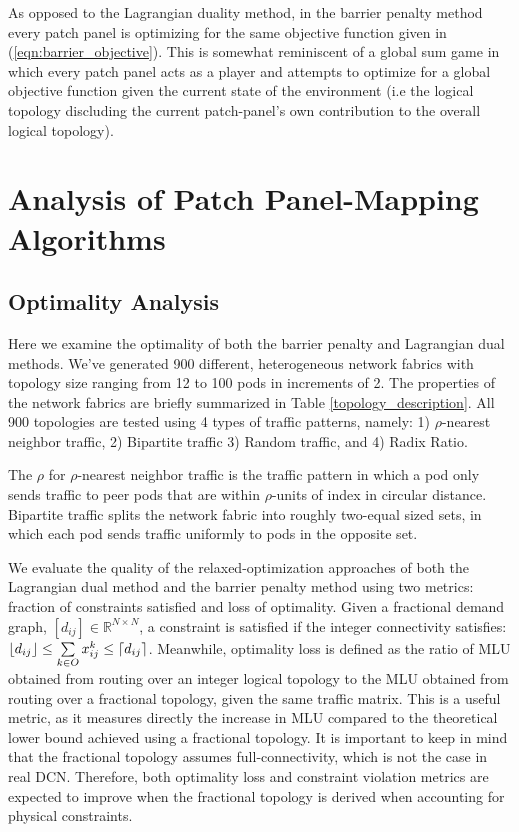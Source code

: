 \documentclass[sigconf]{acmart}
\theoremstyle{definition}
\begin{document}
As opposed to the Lagrangian duality method, in the barrier penalty method every patch panel is optimizing for the same objective function given in (\ref{eqn:barrier_objective}). This is somewhat reminiscent of a global sum game in which every patch panel acts as a player and attempts to optimize for a global objective function given the current state of the environment (i.e the logical topology discluding the current patch-panel's own contribution to the overall logical topology).

\section{Analysis of Patch Panel-Mapping Algorithms}\label{section_reconfiguration_algo_analysis}
\subsection{Optimality Analysis}
Here we examine the optimality of both the barrier penalty and Lagrangian dual methods. We've generated 900 different, heterogeneous network fabrics with topology size ranging from 12 to 100 pods in increments of 2. The properties of the network fabrics are briefly summarized in Table \ref{topology_description}. All 900 topologies are tested using 4 types of traffic patterns, namely: 1) $\rho$-nearest neighbor traffic, 2) Bipartite traffic 3) Random traffic, and 4) Radix Ratio.

The $\rho$ for $\rho$-nearest neighbor traffic is the traffic pattern in which a pod only sends traffic to peer pods that are within $\rho$-units of index in circular distance. Bipartite traffic splits the network fabric into roughly two-equal sized sets, in which each pod sends traffic uniformly to pods in the opposite set.

We evaluate the quality of the relaxed-optimization approaches of both the Lagrangian dual method and the barrier penalty method using two metrics: fraction of constraints satisfied and loss of optimality. Given a fractional demand graph, $[d_{ij}] \in \mathbb{R}^{N \times N}$, a constraint is satisfied if the integer connectivity satisfies: $\left\lfloor d_{ij} \right\rfloor\leq \sum\limits_{k \in O}x_{ij}^k \leq \left\lceil d_{ij} \right\rceil$. Meanwhile, optimality loss is defined as the ratio of MLU obtained from routing over an integer logical topology to the MLU obtained from routing over a fractional topology, given the same traffic matrix. This is a useful metric, as it measures directly the increase in MLU compared to the theoretical lower bound achieved using a  fractional topology. It is important to keep in mind that the fractional topology assumes full-connectivity, which is not the case in real DCN. Therefore, both optimality loss and constraint violation metrics are expected to improve when the fractional topology is derived when accounting for physical constraints.
\end{document}
